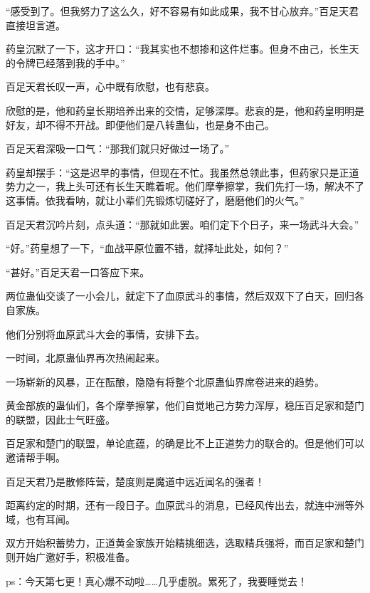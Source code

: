 \begin{this_body}
“感受到了。但我努力了这么久，好不容易有如此成果，我不甘心放弃。”百足天君直接坦言道。

药皇沉默了一下，这才开口：“我其实也不想掺和这件烂事。但身不由己，长生天的令牌已经落到我的手中。”

百足天君长叹一声，心中既有欣慰，也有悲哀。

欣慰的是，他和药皇长期培养出来的交情，足够深厚。悲哀的是，他和药皇明明是好友，却不得不开战。即便他们是八转蛊仙，也是身不由己。

百足天君深吸一口气：“那我们就只好做过一场了。”

药皇却摆手：“这是迟早的事情，但现在不忙。我虽然总领此事，但药家只是正道势力之一，我上头可还有长生天瞧着呢。他们摩拳擦掌，我们先打一场，解决不了这事情。依我看呐，就让小辈们先锻炼切磋好了，磨磨他们的火气。”

百足天君沉吟片刻，点头道：“那就如此罢。咱们定下个日子，来一场武斗大会。”

“好。”药皇想了一下，“血战平原位置不错，就择址此处，如何？”

“甚好。”百足天君一口答应下来。

两位蛊仙交谈了一小会儿，就定下了血原武斗的事情，然后双双下了白天，回归各自家族。

他们分别将血原武斗大会的事情，安排下去。

一时间，北原蛊仙界再次热闹起来。

一场崭新的风暴，正在酝酿，隐隐有将整个北原蛊仙界席卷进来的趋势。

黄金部族的蛊仙们，各个摩拳擦掌，他们自觉地己方势力浑厚，稳压百足家和楚门的联盟，因此士气旺盛。

百足家和楚门的联盟，单论底蕴，的确是比不上正道势力的联合的。但是他们可以邀请帮手啊。

百足天君乃是散修阵营，楚度则是魔道中远近闻名的强者！

距离约定的时期，还有一段日子。血原武斗的消息，已经风传出去，就连中洲等外域，也有耳闻。

双方开始积蓄势力，正道黄金家族开始精挑细选，选取精兵强将，而百足家和楚门则开始广邀好手，积极准备。

ps：今天第七更！真心爆不动啦……几乎虚脱。累死了，我要睡觉去！

\end{this_body}

